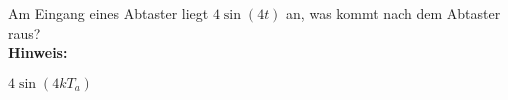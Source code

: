 \begin{question}[section=6,name={Abtaster},difficulty=,type=mdl,tags={}]
	Am Eingang eines Abtaster liegt $4\sin(4t)$ an, was kommt nach dem Abtaster raus?
	\\ \textbf{Hinweis:}\\
	
\end{question}
\begin{solution}
	$4\sin(4kT_a)$
\end{solution}